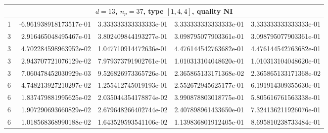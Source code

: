 \documentclass{article}
\begin{document}
\begin{center}
\begin{tabular}{rrrrr}
\multicolumn{5}{c}{\rmfamily $d=13$, $n_p=37$, type $[1,4,4]$, quality NI}\\
\toprule
1 & -6.961938918173517e-01 & 3.333333333333333e-01 & 3.333333333333333e-01 & 3.333333333333333e-01\\
3 & ~2.916465048495467e-01 & 3.802409844193277e-01 & 3.098795077903361e-01 & 3.098795077903361e-01\\
3 & ~4.702284598963952e-02 & 1.047710914472636e-01 & 4.476144542763682e-01 & 4.476144542763682e-01\\
3 & ~2.943707721076129e-02 & 7.979373791902761e-01 & 1.010313104048620e-01 & 1.010313104048620e-01\\
3 & ~7.060478452030929e-03 & 9.526826973365726e-01 & 2.365865133171368e-02 & 2.365865133171368e-02\\
6 & ~4.748213927210297e-02 & 1.255412745019193e-01 & 2.552672945625177e-01 & 6.191914309355630e-01\\
6 & ~1.837479881995625e-02 & 2.035044354178874e-02 & 3.990878803018775e-01 & 5.805616761563338e-01\\
6 & ~1.907290693660829e-02 & 2.679648266402744e-02 & 2.407898961433650e-01 & 7.324136211926076e-01\\
6 & ~1.018568368990188e-02 & 1.643529593541106e-02 & 1.139836801912405e-01 & 8.695810238733484e-01\\
\bottomrule
\end{tabular}
\bigskip
\end{center}





\end{document}
